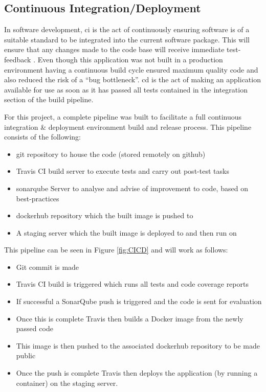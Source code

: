 \subsection{Continuous Integration/Deployment}
\label{sub:ci_cd}
In software development, \gls{ci} is the act of continuously ensuring software is of a suitable standard to be integrated into the current software package. This will ensure that any changes made to the code base will receive immediate test-feedback \citep{Fowler2006}. Even though this application was not built in a production environment having a continuous build cycle ensured maximum quality code and also reduced the risk of a ``bug bottleneck''. \Gls{cd} is the act of making an application available for use as soon as it has passed all tests contained in the integration section of the build pipeline.

For this project, a complete pipeline was built to facilitate a full continuous integration \& deployment environment build and release process. This pipeline consists of the following:

\begin{itemize}
	\item \gls{git} repository to house the code (stored remotely on \gls{github})
	\item \gls{Travis} CI build server to execute tests and carry out post-test tasks
	\item \gls{sonarqube} Server to analyse and advise of improvement to code, based on best-practices
	\item \gls{dockerhub} repository which the built image is pushed to
	\item A \gls{staging server} which the built image is deployed to and then run on
\end{itemize}

This pipeline can be seen in Figure \ref{fig:CICD} and will work as follows:

\begin{itemize}
	\item Git commit is made
	\item Travis CI build is triggered which runs all tests and \gls{code coverage} reports
	\item If successful a SonarQube push is triggered and the code is sent for evaluation
	\item Once this is complete Travis then builds a \gls{Docker image} from the newly passed code
	\item This image is then pushed to the associated \gls{dockerhub} repository to be made public
	\item Once the push is complete Travis then deploys the application (by running a container) on the \gls{staging server}.
\end{itemize}

